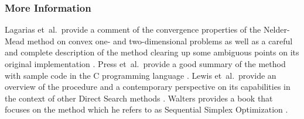 \subsubsection{More Information}
Lagarias et~al.\ provide a comment of the convergence properties of the Nelder-Mead method on convex one- and two-dimensional problems as well as a careful and complete description of the method clearing up some ambiguous points on its original implementation \cite{Lagarias1998}. Press et~al.\ provide a good summary of the method with sample code in the C programming language \cite{Press2007}. Lewis et~al.\ provide an overview of the procedure and a contemporary perspective on its capabilities in the context of other Direct Search methods \cite{Lewis2000}.
Walters provides a book that focuses on the method which he refers to as Sequential Simplex Optimization \cite{Walters1991}.

